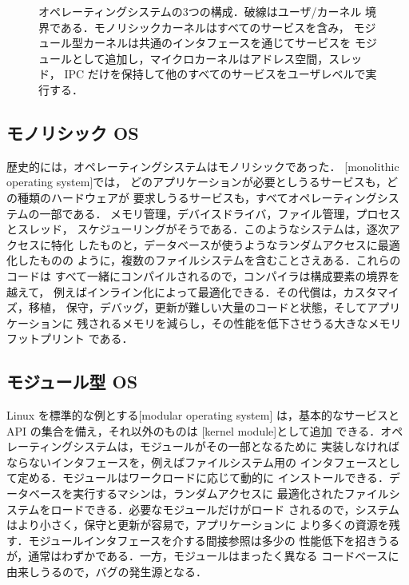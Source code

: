 \documentclass[../main.tex]{subfiles}
\begin{document}
\begin{figure}[htbp]
  \centering
  
  \caption{オペレーティングシステムの3つの構成．破線はユーザ/カーネル
    境界である．モノリシックカーネルはすべてのサービスを含み，
    モジュール型カーネルは共通のインタフェースを通じてサービスを
    モジュールとして追加し，マイクロカーネルはアドレス空間，スレッド，
    IPC だけを保持して他のすべてのサービスをユーザレベルで実行する．}
  \label{fig:l01-structures}
\end{figure}

\subsection{モノリシック OS}

歴史的には，オペレーティングシステムはモノリシックであった．
[monolithic operating system]では，
どのアプリケーションが必要としうるサービスも，どの種類のハードウェアが
要求しうるサービスも，すべてオペレーティングシステムの一部である．
メモリ管理，デバイスドライバ，ファイル管理，プロセスとスレッド，
スケジューリングがそうである．このようなシステムは，逐次アクセスに特化
したものと，データベースが使うようなランダムアクセスに最適化したものの
ように，複数のファイルシステムを含むことさえある．これらのコードは
すべて一緒にコンパイルされるので，コンパイラは構成要素の境界を越えて，
例えばインライン化によって最適化できる．その代償は，カスタマイズ，移植，
保守，デバッグ，更新が難しい大量のコードと状態，そしてアプリケーションに
残されるメモリを減らし，その性能を低下させうる大きなメモリフットプリント
である．

\subsection{モジュール型 OS}

Linux を標準的な例とする[modular operating system]%
は，基本的なサービスと API の集合を備え，それ以外のものは
[kernel module]として追加
できる．オペレーティングシステムは，モジュールがその一部となるために
実装しなければならないインタフェースを，例えばファイルシステム用の
インタフェースとして定める．モジュールはワークロードに応じて動的に
インストールできる．データベースを実行するマシンは，ランダムアクセスに
最適化されたファイルシステムをロードできる．必要なモジュールだけがロード
されるので，システムはより小さく，保守と更新が容易で，アプリケーションに
より多くの資源を残す．モジュールインタフェースを介する間接参照は多少の
性能低下を招きうるが，通常はわずかである．一方，モジュールはまったく異なる
コードベースに由来しうるので，バグの発生源となる．
\end{document}
